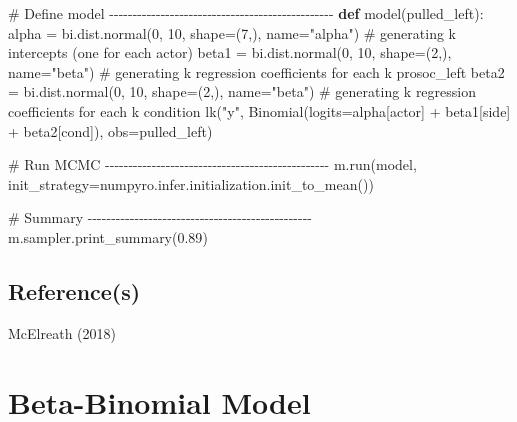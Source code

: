 \documentclass[
  letterpaper,
  DIV=11,
  numbers=noendperiod]{scrreprt}
\newenvironment{Shaded}{\begin{snugshade}}{\end{snugshade}}
\newcommand{\CommentTok}[1]{\textcolor[rgb]{0.37,0.37,0.37}{#1}}
\newcommand{\DecValTok}[1]{\textcolor[rgb]{0.68,0.00,0.00}{#1}}
\newcommand{\FloatTok}[1]{\textcolor[rgb]{0.68,0.00,0.00}{#1}}
\newcommand{\KeywordTok}[1]{\textcolor[rgb]{0.00,0.23,0.31}{\textbf{#1}}}
\newcommand{\NormalTok}[1]{\textcolor[rgb]{0.00,0.23,0.31}{#1}}
\newcommand{\OperatorTok}[1]{\textcolor[rgb]{0.37,0.37,0.37}{#1}}
\newcommand{\StringTok}[1]{\textcolor[rgb]{0.13,0.47,0.30}{#1}}
\begin{document}
\begin{tcolorbox}
\begin{Shaded}
\begin{Highlighting}[]
\CommentTok{\# Define model {-}{-}{-}{-}{-}{-}{-}{-}{-}{-}{-}{-}{-}{-}{-}{-}{-}{-}{-}{-}{-}{-}{-}{-}{-}{-}{-}{-}{-}{-}{-}{-}{-}{-}{-}{-}{-}{-}{-}{-}{-}{-}{-}{-}{-}{-}{-}{-}}
\KeywordTok{def}\NormalTok{ model(pulled\_left):}
\NormalTok{    alpha }\OperatorTok{=}\NormalTok{ bi.dist.normal(}\DecValTok{0}\NormalTok{, }\DecValTok{10}\NormalTok{, shape}\OperatorTok{=}\NormalTok{(}\DecValTok{7}\NormalTok{,), name}\OperatorTok{=}\StringTok{"alpha"}\NormalTok{)  }\CommentTok{\# generating k intercepts (one for each actor)}
\NormalTok{    beta1 }\OperatorTok{=}\NormalTok{ bi.dist.normal(}\DecValTok{0}\NormalTok{, }\DecValTok{10}\NormalTok{, shape}\OperatorTok{=}\NormalTok{(}\DecValTok{2}\NormalTok{,), name}\OperatorTok{=}\StringTok{"beta"}\NormalTok{)  }\CommentTok{\# generating k regression coefficients for each k prosoc\_left}
\NormalTok{    beta2 }\OperatorTok{=}\NormalTok{ bi.dist.normal(}\DecValTok{0}\NormalTok{, }\DecValTok{10}\NormalTok{, shape}\OperatorTok{=}\NormalTok{(}\DecValTok{2}\NormalTok{,), name}\OperatorTok{=}\StringTok{"beta"}\NormalTok{)  }\CommentTok{\# generating k regression coefficients for each k condition}
\NormalTok{    lk(}\StringTok{"y"}\NormalTok{, Binomial(logits}\OperatorTok{=}\NormalTok{alpha[actor] }\OperatorTok{+}\NormalTok{ beta1[side] }\OperatorTok{+}\NormalTok{ beta2[cond]), obs}\OperatorTok{=}\NormalTok{pulled\_left)}

\CommentTok{\# Run MCMC {-}{-}{-}{-}{-}{-}{-}{-}{-}{-}{-}{-}{-}{-}{-}{-}{-}{-}{-}{-}{-}{-}{-}{-}{-}{-}{-}{-}{-}{-}{-}{-}{-}{-}{-}{-}{-}{-}{-}{-}{-}{-}{-}{-}{-}{-}{-}{-}}
\NormalTok{m.run(model, init\_strategy}\OperatorTok{=}\NormalTok{numpyro.infer.initialization.init\_to\_mean()) }

\CommentTok{\# Summary {-}{-}{-}{-}{-}{-}{-}{-}{-}{-}{-}{-}{-}{-}{-}{-}{-}{-}{-}{-}{-}{-}{-}{-}{-}{-}{-}{-}{-}{-}{-}{-}{-}{-}{-}{-}{-}{-}{-}{-}{-}{-}{-}{-}{-}{-}{-}{-}}
\NormalTok{m.sampler.print\_summary(}\FloatTok{0.89}\NormalTok{)}
\end{Highlighting}
\end{Shaded}

\end{tcolorbox}

\section{Reference(s)}\label{references-4}

McElreath (2018)


\chapter{Beta-Binomial Model}\label{beta-binomial-model}
\end{document}
